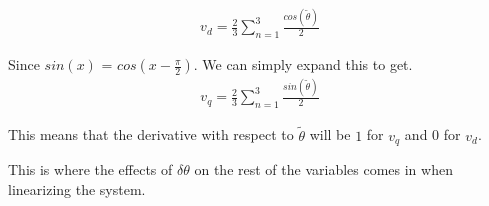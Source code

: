 \begin{align}
    v_d = \frac{2}{3}\sum_{n=1}^3 \frac{cos(\tilde{\theta})}{2}
\end{align}{}

Since $sin(x)$ = $cos(x -\frac{\pi}{2})$. We can simply expand this to get. 
\begin{align}
    v_q = \frac{2}{3}\sum_{n=1}^3 \frac{sin(\tilde{\theta})}{2}
\end{align}{}

This means that the derivative with respect to $\tilde{\theta}$ will be $1$ for $v_q$ and 0 for $v_d$. 

This is where the effects of  $\delta \theta$  on the rest of the variables comes in when linearizing the system. 

